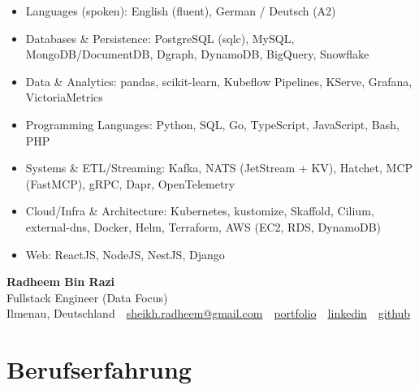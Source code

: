 \documentclass[10pt,a4paper]{resume}
\makeatletter
\newcommand{\Portfolio}{https://radheem.github.io/my-cv}
\newcommand{\PortfolioText}{portfolio}
\newcommand{\GitHub}{https://github.com/radheem}
\newcommand{\LinkedIn}{https://www.linkedin.com/in/radheem-razi}
\newcommand{\Email}{sheikh.radheem@gmail.com}
\makeatother
\begin{document}
\begin{itemize}[leftmargin=1.4em,nosep,topsep=2pt]
  \item Languages (spoken): English (fluent), German / Deutsch (A2)
  \item Databases \& Persistence: PostgreSQL (sqlc), MySQL, MongoDB/DocumentDB, Dgraph, DynamoDB, BigQuery, Snowflake
  \item Data \& Analytics: pandas, scikit-learn, Kubeflow Pipelines, KServe, Grafana, VictoriaMetrics
  \item Programming Languages: Python, SQL, Go, TypeScript, JavaScript, Bash, PHP
  \item Systems \& ETL/Streaming: Kafka, NATS (JetStream + KV), Hatchet, MCP (FastMCP), gRPC, Dapr, OpenTelemetry
  \item Cloud/Infra \& Architecture: Kubernetes, kustomize, Skaffold, Cilium, external-dns, Docker, Helm, Terraform, AWS (EC2, RDS, DynamoDB)
  \item Web: ReactJS, NodeJS, NestJS, Django
\end{itemize}

\clearpage
{}

\begin{center}
  {\huge\bfseries Radheem Bin Razi}\\[3pt]
  {\large Fullstack Engineer (Data Focus)}\\[6pt]
  \small
  Ilmenau, Deutschland \,\textbar\,
  \href{mailto:\Email}{\Email} \,\textbar\,
  \href{\Portfolio}{\PortfolioText} \,\textbar\,
  \href{\LinkedIn}{linkedin} \,\textbar\,
  \href{\GitHub}{github}
\end{center}
\vspace{2pt}

\section{Berufserfahrung}
\end{document}
